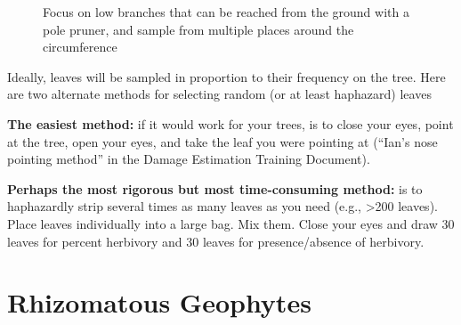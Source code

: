 \documentclass[
  letterpaper,
  DIV=11,
  numbers=noendperiod]{scrreprt}
\begin{document}
\begin{figure}


\caption{\label{fig-tree}Focus on low branches that can be reached from
the ground with a pole pruner, and sample from multiple places around
the circumference}

\end{figure}%

Ideally, leaves will be sampled in proportion to their frequency on the
tree. Here are two alternate methods for selecting random (or at least
haphazard) leaves

\textbf{The easiest method:} if it would work for your trees, is to
close your eyes, point at the tree, open your eyes, and take the leaf
you were pointing at (``Ian's nose pointing method'' in the Damage
Estimation Training Document).

\textbf{Perhaps the most rigorous but most time-consuming method: } is
to haphazardly strip several times as many leaves as you need (e.g.,
\textgreater200 leaves). Place leaves individually into a large bag. Mix
them. Close your eyes and draw 30 leaves for percent herbivory and 30
leaves for presence/absence of herbivory.

\chapter{Rhizomatous Geophytes}\label{sec-rhizo}
\end{document}
